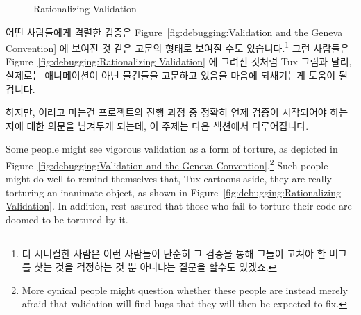 \begin{figure}[tb]
\centering
{}
\caption{Rationalizing Validation}
\end{figure}

어떤 사람들에게 격렬한 검증은
Figure~\ref{fig:debugging:Validation and the Geneva Convention} 에 보여진 것
같은 고문의 형태로 보여질 수도 있습니다.\footnote{
	더 시니컬한 사람은 이런 사람들이 단순히 그 검증을 통해 그들이 고쳐야 할
	버그를 찾는 것을 걱정하는 것 뿐 아니냐는 질문을 할수도 있겠죠.}
그런 사람들은
Figure~\ref{fig:debugging:Rationalizing Validation} 에 그려진 것처럼 Tux 그림과
달리, 실제로는 애니메이션이 아닌 물건들을 고문하고 있음을 마음에 되새기는게
도움이 될겁니다.

하지만, 이러고 마는건 프로젝트의 진행 과정 중 정확히 언제 검증이 시작되어야
하는지에 대한 의문을 남겨두게 되는데, 이 주제는 다음 섹션에서 다루어집니다.
\iffalse

Some people might see vigorous validation as a form of torture, as
depicted in
Figure~\ref{fig:debugging:Validation and the Geneva Convention}.\footnote{
	More cynical people might question whether these people are instead
	merely afraid that validation will find bugs that they will then
	be expected to fix.}
Such people might do well to remind themselves that, Tux cartoons aside,
they are really torturing an inanimate object, as shown in
Figure~\ref{fig:debugging:Rationalizing Validation}.
In addition, rest assured that those who fail to torture their code are
doomed to be tortured by it.

